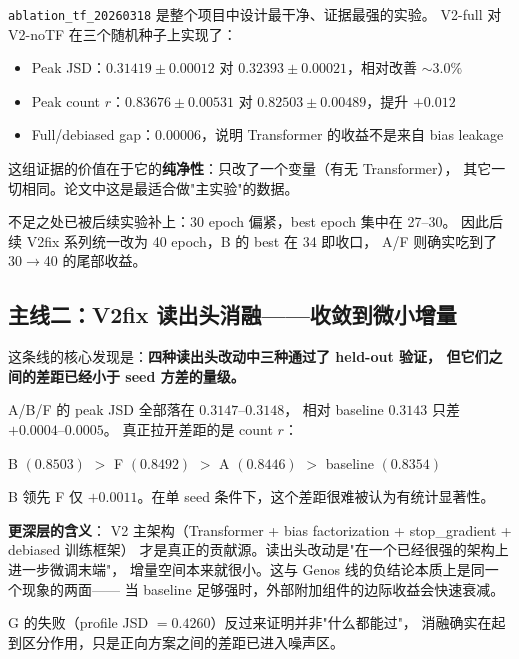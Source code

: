 \documentclass[11pt,a4paper]{ctexart}
\begin{document}
\texttt{ablation\_tf\_20260318} 是整个项目中设计最干净、证据最强的实验。
V2-full 对 V2-noTF 在三个随机种子上实现了：

\begin{itemize}[leftmargin=2em]
  \item Peak JSD：$0.31419 \pm 0.00012$ 对 $0.32393 \pm 0.00021$，相对改善 $\sim 3.0\%$
  \item Peak count $r$：$0.83676 \pm 0.00531$ 对 $0.82503 \pm 0.00489$，提升 $+0.012$
  \item Full/debiased gap：$0.00006$，说明 Transformer 的收益不是来自 bias leakage
\end{itemize}

这组证据的价值在于它的\textbf{纯净性}：只改了一个变量（有无 Transformer），
其它一切相同。论文中这是最适合做"主实验"的数据。

不足之处已被后续实验补上：30 epoch 偏紧，best epoch 集中在 27--30。
因此后续 V2fix 系列统一改为 40 epoch，B 的 best 在 34 即收口，
A/F 则确实吃到了 30$\to$40 的尾部收益。

\subsection{主线二：V2fix 读出头消融——收敛到微小增量}

这条线的核心发现是：\textbf{四种读出头改动中三种通过了 held-out 验证，
但它们之间的差距已经小于 seed 方差的量级。}

A/B/F 的 peak JSD 全部落在 $0.3147$--$0.3148$，
相对 baseline $0.3143$ 只差 $+0.0004$--$0.0005$。
真正拉开差距的是 count $r$：

\begin{center}
B $(0.8503)$ $>$ F $(0.8492)$ $>$ A $(0.8446)$ $>$ baseline $(0.8354)$
\end{center}

B 领先 F 仅 $+0.0011$。在单 seed 条件下，这个差距很难被认为有统计显著性。

\textbf{更深层的含义}：
V2 主架构（Transformer + bias factorization + stop\_gradient + debiased 训练框架）
才是真正的贡献源。读出头改动是"在一个已经很强的架构上进一步微调末端"，
增量空间本来就很小。这与 Genos 线的负结论本质上是同一个现象的两面——
当 baseline 足够强时，外部附加组件的边际收益会快速衰减。

G 的失败（profile JSD $= 0.4260$）反过来证明并非"什么都能过"，
消融确实在起到区分作用，只是正向方案之间的差距已进入噪声区。
\end{document}
